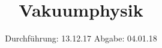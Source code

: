 

\subject{V 70}
\title{Vakuumphysik}
\date{
  Durchführung: 13.12.17
  \hspace{3em}
  Abgabe: 04.01.18
}



\maketitle
\thispagestyle{empty}
\tableofcontents
\newpage
\setcounter{page}{1}





\printbibliography


